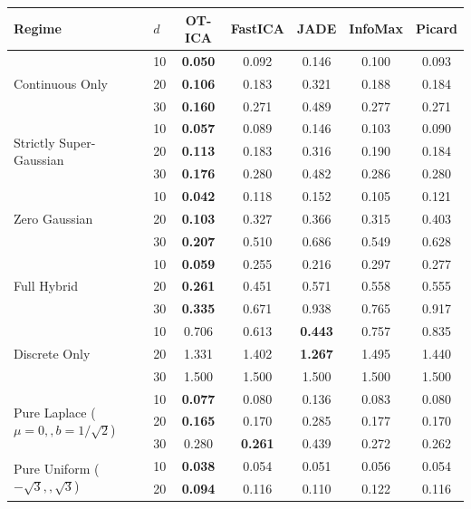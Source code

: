 \documentclass[accepted]{tpm2026} %
\begin{document}
\begin{table}[htbp]
\centering
\setlength{\tabcolsep}{10pt}
\begin{tabular}{llccccc}
\toprule
\textbf{Regime} & $d$ & \textbf{OT-ICA} & \textbf{FastICA} & \textbf{JADE} & \textbf{InfoMax} & \textbf{Picard} \\
\midrule
\multirow{3}{*}{Continuous Only}
 & 10 & \textbf{0.050} & 0.092 & 0.146 & 0.100 & 0.093 \\
 & 20 & \textbf{0.106} & 0.183 & 0.321 & 0.188 & 0.184 \\
 & 30 & \textbf{0.160} & 0.271 & 0.489 & 0.277 & 0.271 \\
\midrule
\multirow{3}{*}{Strictly Super-Gaussian}
 & 10 & \textbf{0.057} & 0.089 & 0.146 & 0.103 & 0.090 \\
 & 20 & \textbf{0.113} & 0.183 & 0.316 & 0.190 & 0.184 \\
 & 30 & \textbf{0.176} & 0.280 & 0.482 & 0.286 & 0.280 \\
\midrule
\multirow{3}{*}{Zero Gaussian}
 & 10 & \textbf{0.042} & 0.118 & 0.152 & 0.105 & 0.121 \\
 & 20 & \textbf{0.103} & 0.327 & 0.366 & 0.315 & 0.403 \\
 & 30 & \textbf{0.207} & 0.510 & 0.686 & 0.549 & 0.628 \\
\midrule
\multirow{3}{*}{Full Hybrid}
 & 10 & \textbf{0.059} & 0.255 & 0.216 & 0.297 & 0.277 \\
 & 20 & \textbf{0.261} & 0.451 & 0.571 & 0.558 & 0.555 \\
 & 30 & \textbf{0.335} & 0.671 & 0.938 & 0.765 & 0.917 \\
\midrule
\multirow{3}{*}{Discrete Only}
 & 10 & 0.706 & 0.613 & \textbf{0.443} & 0.757 & 0.835 \\
 & 20 & 1.331 & 1.402 & \textbf{1.267} & 1.495 & 1.440 \\
 & 30 & 1.500 & 1.500 & 1.500 & 1.500 & 1.500 \\
\midrule
\multirow{3}{*}{Pure Laplace ($\mu=0,, b=1/\sqrt{2}$)}
 & 10 & \textbf{0.077} & 0.080 & 0.136 & 0.083 & 0.080 \\
 & 20 & \textbf{0.165} & 0.170 & 0.285 & 0.177 & 0.170 \\
 & 30 & 0.280 & \textbf{0.261} & 0.439 & 0.272 & 0.262 \\
\midrule
\multirow{3}{*}{Pure Uniform ($-\sqrt{3},, \sqrt{3}$)}
 & 10 & \textbf{0.038} & 0.054 & 0.051 & 0.056 & 0.054 \\
 & 20 & \textbf{0.094} & 0.116 & 0.110 & 0.122 & 0.116 \\

\end{tabular}
\end{table}
\end{document}
